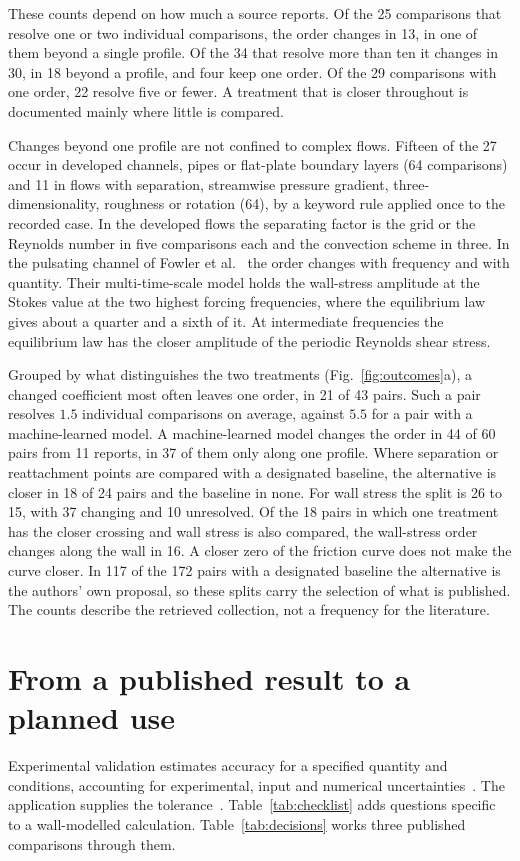 \documentclass[pdflatex,sn-nature,iicol]{sn-jnl}
\begin{document}
These counts depend on how much a source reports. Of the 25 comparisons that resolve one or two individual comparisons, the order changes in 13, in one of them beyond a single profile. Of the 34 that resolve more than ten it changes in 30, in 18 beyond a profile, and four keep one order. Of the 29 comparisons with one order, 22 resolve five or fewer. A treatment that is closer throughout is documented mainly where little is compared.

Changes beyond one profile are not confined to complex flows. Fifteen of the 27 occur in developed channels, pipes or flat-plate boundary layers (64 comparisons) and 11 in flows with separation, streamwise pressure gradient, three-dimensionality, roughness or rotation (64), by a keyword rule applied once to the recorded case. In the developed flows the separating factor is the grid or the Reynolds number in five comparisons each and the convection scheme in three. In the pulsating channel of Fowler et al.~\cite{Fowler2023} the order changes with frequency and with quantity. Their multi-time-scale model holds the wall-stress amplitude at the Stokes value at the two highest forcing frequencies, where the equilibrium law gives about a quarter and a sixth of it. At intermediate frequencies the equilibrium law has the closer amplitude of the periodic Reynolds shear stress.

Grouped by what distinguishes the two treatments (Fig.~\ref{fig:outcomes}a), a changed coefficient most often leaves one order, in 21 of 43 pairs. Such a pair resolves $1.5$ individual comparisons on average, against $5.5$ for a pair with a machine-learned model. A machine-learned model changes the order in 44 of 60 pairs from 11 reports, in 37 of them only along one profile. Where separation or reattachment points are compared with a designated baseline, the alternative is closer in 18 of 24 pairs and the baseline in none. For wall stress the split is 26 to 15, with 37 changing and 10 unresolved. Of the 18 pairs in which one treatment has the closer crossing and wall stress is also compared, the wall-stress order changes along the wall in 16. A closer zero of the friction curve does not make the curve closer. In 117 of the 172 pairs with a designated baseline the alternative is the authors' own proposal, so these splits carry the selection of what is published. The counts describe the retrieved collection, not a frequency for the literature.

\section{From a published result to a planned use}\label{sec:procedure}
Experimental validation estimates accuracy for a specified quantity and conditions, accounting for experimental, input and numerical uncertainties~\cite{OberkampfTrucano2002,ASMEVV20}. The application supplies the tolerance~\cite{Eca2022}. Table~\ref{tab:checklist} adds questions specific to a wall-modelled calculation. Table~\ref{tab:decisions} works three published comparisons through them.
\end{document}
